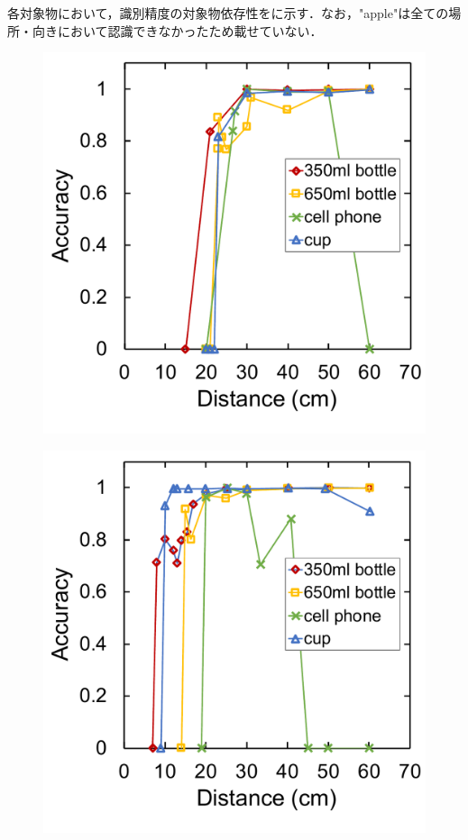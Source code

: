 各対象物において，識別精度の対象物依存性をに示す．なお，"apple"は全ての場所・向きにおいて認識できなかったため載せていない．
\begin{figure}[H]
    \centering
    \begin{minipage}{0.49\columnwidth}
        \centering
        \includegraphics[width=\linewidth]{figure/chapter4/mrcnn_depth}
        \label{fig:mrcnn距離そのまま}
    \end{minipage}
    \hspace*{\fill}
    \begin{minipage}{0.49\columnwidth}
        \centering
        \includegraphics[width=\linewidth]{figure/chapter4/mrcnn_depth_padding}

\end{minipage}
\end{figure}
